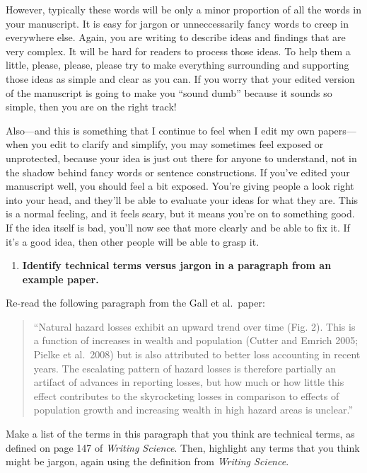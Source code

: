 \documentclass[]{tufte-book}
\providecommand{\tightlist}{%
  \setlength{\itemsep}{0pt}\setlength{\parskip}{0pt}}
\begin{document}
However, typically these words will be only a minor proportion of all the words
in your manuscript. It is easy for jargon or unneccessarily fancy words to creep
in everywhere else. Again, you are writing to describe ideas and findings that
are very complex. It will be hard for readers to process those ideas. To help
them a little, please, please, please try to make everything surrounding and
supporting those ideas as simple and clear as you can. If you worry that your
edited version of the manuscript is going to make you ``sound dumb'' because it
sounds so simple, then you are on the right track!

Also---and this is something that I continue to feel when I edit my own
papers---when you edit to clarify and simplify, you may sometimes feel exposed
or unprotected, because your idea is just out there for anyone to understand,
not in the shadow behind fancy words or sentence constructions. If you've edited
your manuscript well, you should feel a bit exposed. You're giving people a look
right into your head, and they'll be able to evaluate your ideas for what they
are. This is a normal feeling, and it feels scary, but it means you're on to
something good. If the idea itself is bad, you'll now see that more clearly and
be able to fix it. If it's a good idea, then other people will be able to grasp
it.

\begin{enumerate}
\def\labelenumi{\arabic{enumi}.}
\setcounter{enumi}{4}
\tightlist
\item
  \textbf{Identify technical terms versus jargon in a paragraph from an example paper.}
\end{enumerate}

Re-read the following paragraph from the Gall et al.~paper:

\begin{quote}
``Natural hazard losses exhibit an upward trend over time (Fig. 2). This is a
function of increases in wealth and population (Cutter and Emrich 2005; Pielke
et al.~2008) but is also attributed to better loss accounting in recent years.
The escalating pattern of hazard losses is therefore partially an artifact of
advances in reporting losses, but how much or how little this effect contributes
to the skyrocketing losses in comparison to effects of population growth and
increasing wealth in high hazard areas is unclear.''
\end{quote}

Make a list of the terms in this paragraph that you think are technical terms,
as defined on page 147 of \emph{Writing Science}. Then, highlight any terms that you
think might be jargon, again using the definition from \emph{Writing Science}.
\end{document}
